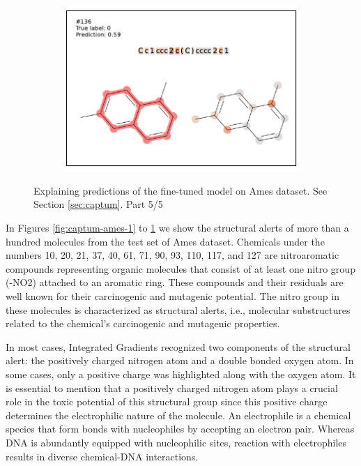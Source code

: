 \begin{figure}
\begin{subfigure}[b]{0.33\textwidth}
\end{subfigure} 
\begin{subfigure}[b]{0.33\textwidth} 
  \centering 
  \includegraphics[width=\textwidth]{figures/ames/ames136.pdf} 
\end{subfigure}

\caption{Explaining predictions of the fine-tuned model on Ames dataset. See Section \ref{sec:captum}. Part 5/5}
\label{fig:captum-ames-5}
\end{figure}

In Figures \ref{fig:captum-ames-1} to \ref{fig:captum-ames-5} we show the structural alerts of more than a hundred molecules from the test set of Ames dataset. Chemicals under the numbers 10, 20, 21, 37, 40, 61, 71, 90, 93, 110, 117, and 127 are nitroaromatic compounds representing organic molecules that consist of at least one nitro group (-NO2) attached to an aromatic ring. These compounds and their residuals are well known for their carcinogenic and mutagenic potential. The nitro group in these molecules is characterized as structural alerts, i.e., molecular substructures related to the chemical's carcinogenic and mutagenic properties. 

In most cases, Integrated Gradients recognized two components of the structural alert: the positively charged nitrogen atom and a double bonded oxygen atom. In some cases, only a positive charge was highlighted along with the oxygen atom. It is essential to mention that a positively charged nitrogen atom plays a crucial role in the toxic potential of this structural group since this positive charge determines the electrophilic nature of the molecule. An electrophile is a chemical species that form bonds with nucleophiles by accepting an electron pair. Whereas DNA is abundantly equipped with nucleophilic sites, reaction with electrophiles results in diverse chemical-DNA interactions.%

